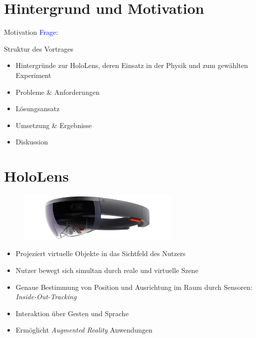 \part{Hintergrund und Motivation}
\label{part:intro}

\begin{frame}[fragile]{Motivation}
\vspace{10px}
\textcolor{blue}{Frage:} 
\end{frame}

\begin{frame}[fragile]{Struktur des Vortrages}
\begin{itemize}
	\item Hintergründe zur HoloLens, deren Einsatz in der Physik und zum gewählten Experiment
	\item Probleme \& Anforderungen
	\item Lösungsansatz
	\item Umsetzung \& Ergebnisse
	\item Diskussion
\end{itemize}
\end{frame}

\part{HoloLens}
\label{part:hololens}
\begin{frame}[fragile]{}
\begin{figure}[h!]
	\centering
	\includegraphics[width=0.7\textwidth]{images/papers/hololens.jpg}
\end{figure}
\begin{itemize}
	\item Projeziert virtuelle Objekte in das Sichtfeld des Nutzers
	\item Nutzer bewegt sich simultan durch reale und virtuelle Szene
	\item Genaue Bestimmung von Position und Ausrichtung im Raum durch Sensoren: \textit{Inside-Out-Tracking}
	\item Interaktion über Gesten und Sprache
	\item Ermöglicht \textit{Augmented Reality} Anwendungen
\end{itemize}	
\end{frame}

